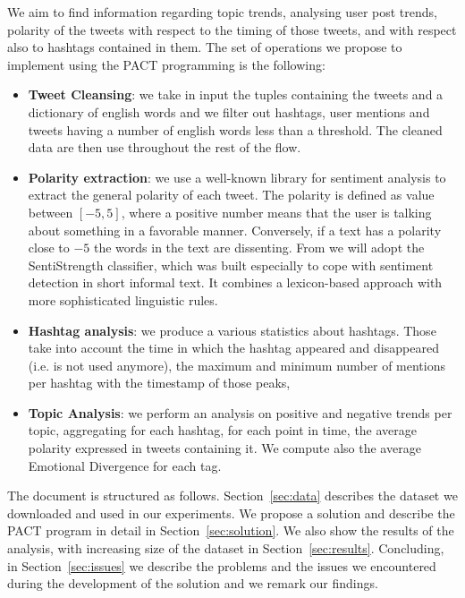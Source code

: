 We aim to find information regarding topic trends, analysing user post trends, polarity of the tweets with respect to the timing of those tweets, and with respect also to hashtags contained in them. 
The set of operations we propose to implement using the PACT programming is the following:  
\begin{itemize}
\item \textbf{Tweet Cleansing}: we take in input the tuples containing the tweets and a dictionary of english words and we filter out hashtags, user mentions and tweets having a number of english words less than a threshold. The cleaned data are then use throughout the rest of the flow. 
\item \textbf{Polarity extraction}: we use a well-known library for sentiment analysis to extract the general polarity of each tweet. The polarity is defined as value between $[-5,5]$, where a positive number means that the user is talking about something in a favorable manner. Conversely, if a text has a polarity close to $-5$ the words in the text are dissenting. 
From \cite{Thelwall:2010:SSS:1890706.1890713}  we will adopt the SentiStrength  classifier, which was built especially to cope with sentiment detection in short informal text.
It combines a lexicon-based approach with more sophisticated linguistic rules.

\item \textbf{Hashtag analysis}: we produce a various statistics about hashtags. 
Those take into account the time in which the hashtag appeared and disappeared (i.e. is not used anymore), the maximum and minimum number of mentions per hashtag with the timestamp of those peaks,  
\item \textbf{Topic Analysis}:  we perform an analysis on positive and negative trends per topic, aggregating for each hashtag, for each point in time, the average polarity expressed in tweets containing it. We compute also the average Emotional Divergence\cite{DBLP:conf:icwsm:PfitznerGS12}  for each tag.
\end{itemize}

The document is structured as follows. Section~\ref{sec:data} describes the dataset we downloaded and used in our experiments. We propose a solution and describe the PACT program in detail in Section~\ref{sec:solution}. We also show the results of the analysis, with increasing size of the dataset in Section~\ref{sec:results}. Concluding, in Section~\ref{sec:issues} we describe the problems and the issues we encountered during the development of the solution and we remark our findings.
